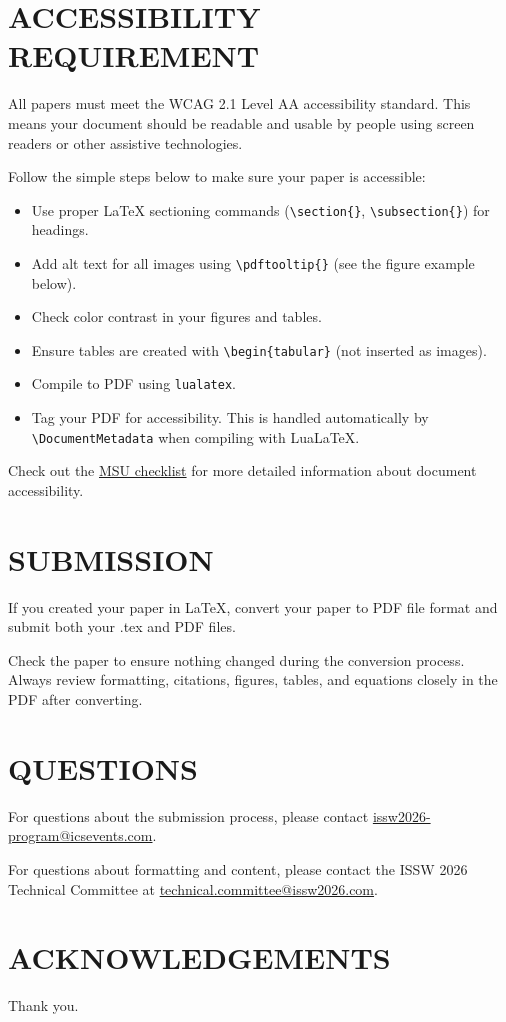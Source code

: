 \documentclass{issw}
\begin{document}
\section{ACCESSIBILITY REQUIREMENT}
All papers must meet the WCAG 2.1 Level AA accessibility standard. This means your document should be readable and usable by people using screen readers or other assistive technologies.

Follow the simple steps below to make sure your paper is accessible:  
\begin{itemize}
 \item Use proper LaTeX sectioning commands (\verb|\section{}|, \verb|\subsection{}|) for headings.
 \item Add alt text for all images using \verb|\pdftooltip{}| (see the figure example below).
 \item Check color contrast in your figures and tables.
 \item Ensure tables are created with \verb|\begin{tabular}| (not inserted as images).
 \item Compile to PDF using \verb|lualatex|.
 \item Tag your PDF for accessibility. This is handled automatically by \verb|\DocumentMetadata| when compiling with LuaLaTeX.
\end{itemize}
Check out the \href{https://guides.lib.montana.edu/accessibility/checklist}{MSU checklist} for more detailed information about document accessibility.

\section{SUBMISSION}
If you created your paper in LaTeX, convert your paper to PDF file format and submit both your .tex and PDF files.

Check the paper to ensure nothing changed during the conversion process. Always review formatting, citations, figures, tables, and equations closely in the PDF after converting.

\section{QUESTIONS}
For questions about the submission process, please contact \href{mailto:issw2026-program@icsevents.com}{issw2026-program@icsevents.com}.

For questions about formatting and content, please contact the ISSW 2026 Technical Committee at \href{mailto:technical.committee@issw2026.com}{technical.committee@issw2026.com}.

{}
\section*{ACKNOWLEDGEMENTS}
Thank you.

\printbibliography[title={REFERENCES}]
\end{document}
